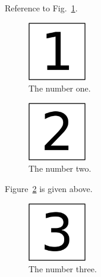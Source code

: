 \newcommand{\plusnamesingular}{}
\newcommand{\starnamesingular}{}
\newcommand{\xrefname}[1]{\protect\renewcommand{\plusnamesingular}{#1}}
\newcommand{\Xrefname}[1]{\protect\renewcommand{\starnamesingular}{#1}}
\providecommand{\cref}{\plusnamesingular~\ref}
\providecommand{\Cref}{\starnamesingular~\ref}
\providecommand{\crefformat}[2]{}
\providecommand{\Crefformat}[2]{}

\crefformat{figure}{Fig.~#2#1#3}
\Crefformat{figure}{Figure~#2#1#3}

Reference to \xrefname{Fig.}\cref{fig:1}.

\begin{figure}
\centering
\includegraphics[width=1.00000in]{img/fig-1.png}
\caption{The number one.\label{fig:1}}
\end{figure}

\begin{figure}
\centering
\includegraphics[width=1.00000in]{img/fig-2.png}
\caption{The number two.\label{fig:2}}
\end{figure}

\Xrefname{Figure}\Cref{fig:2} is given above.

\begin{figure}
\centering
\includegraphics[width=1.00000in]{img/fig-3.png}
\caption{The number three.}
\end{figure}
